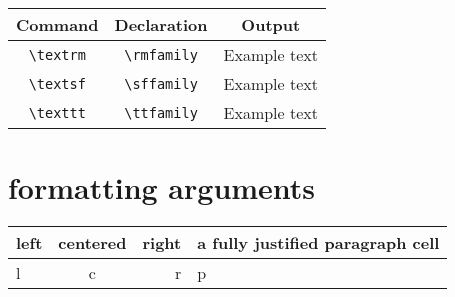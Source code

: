\documentclass{article}
\newcommand{\head}[1]{\textnormal{\textbf{#1}}}
\begin{document}
\begin{tabular}{c | c | c}
\hline
\head{Command} & \head{Declaration} & \head{Output}\\
\hline
\verb|\textrm| & \verb|\rmfamily| & \rmfamily Example text\\
\verb|\textsf| & \verb|\sffamily| & \sffamily Example text\\
\verb|\texttt| & \verb|\ttfamily| & \ttfamily Example text\\
\hline
\end{tabular}

\section{formatting arguments} %
\label{sec:formatting_arguments}
\begin{tabular}{|l|c|r|p{1.7cm}|}
\hline
left & centered & right & a fully justified paragraph cell\\
\hline
l & c & r & p\\
\hline
\end{tabular}
\end{document}
